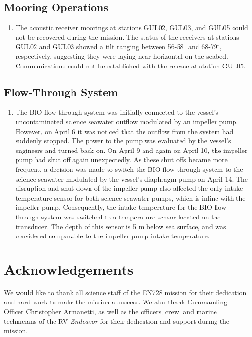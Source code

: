 \documentclass[12pt]{article}\usepackage[]{graphicx}\usepackage[]{color}
\begin{document}
\subsection{Mooring Operations}\label{mooring-operations-1}
\begin{enumerate}
\def\labelenumi{\arabic{enumi}.}

\item
  The acoustic receiver moorings at stations GUL02, GUL03, and GUL05 could not be recovered during the mission. The status of the receivers at stations GUL02 and GUL03 showed a tilt ranging between 56-58\(^\circ\) and 68-79\(^\circ\), respectively, suggesting they were laying near-horizontal on the seabed. Communications could not be established with the release at station GUL05.
\end{enumerate}
\subsection{Flow-Through System}\label{flow-through-system}
\begin{enumerate}
\def\labelenumi{\arabic{enumi}.}

\item
  The BIO flow-through system was initially connected to the vessel's uncontaminated science seawater outflow modulated by an impeller pump. However, on April 6 it was noticed that the outflow from the system had suddenly stopped. The power to the pump was evaluated by the vessel's engineers and turned back on. On April 9 and again on April 10, the impeller pump had shut off again unexpectedly. As these shut offs became more frequent, a decision was made to switch the BIO flow-through system to the science seawater modulated by the vessel's diaphragm pump on April 14. The disruption and shut down of the impeller pump also affected the only intake temperature sensor for both science seawater pumps, which is inline with the impeller pump. Consequently, the intake temperature for the BIO flow-through system was switched to a temperature sensor located on the transducer. The depth of this sensor is 5 m below sea surface, and was considered comparable to the impeller pump intake temperature.
\end{enumerate}
\clearpage

\section{Acknowledgements}\label{acks}

We would like to thank all science staff of the EN728 mission for their dedication and hard work to make the mission a success. We also thank Commanding Officer Christopher Armanetti, as well as the officers, crew, and marine technicians of the RV \emph{Endeavor} for their dedication and support during the mission.
\end{document}
